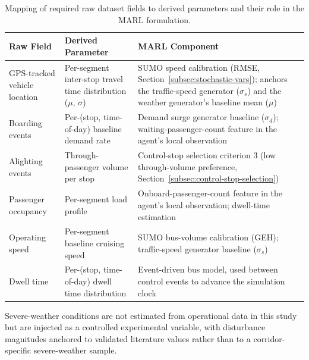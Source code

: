 \begin{table}[htbp]
\centering
\caption{Mapping of required raw dataset fields to derived parameters and their role in the MARL formulation.}
\label{tab:field-mapping}
\small
\renewcommand{\arraystretch}{1.25}

\begin{tabularx}{\textwidth}{
>{\RaggedRight\arraybackslash}p{}
>{\RaggedRight\arraybackslash}p{}
>{\RaggedRight\arraybackslash}X
}

\toprule
\textbf{Raw Field} & \textbf{Derived Parameter} & \textbf{MARL Component} \\
\midrule

GPS-tracked vehicle location &
Per-segment inter-stop travel time distribution ($\mu$, $\sigma$) &
SUMO speed calibration (RMSE, Section~\ref{subsec:stochastic-vars}); anchors the traffic-speed generator ($\sigma_s$) and the weather generator's baseline mean ($\mu$) \\

Boarding events &
Per-(stop, time-of-day) baseline demand rate &
Demand surge generator baseline ($\sigma_d$); waiting-passenger-count feature in the agent's local observation \\

Alighting events &
Through-passenger volume per stop &
Control-stop selection criterion 3 (low through-volume preference, Section~\ref{subsec:control-stop-selection}) \\

Passenger occupancy &
Per-segment load profile &
Onboard-passenger-count feature in the agent's local observation; dwell-time estimation \\

Operating speed &
Per-segment baseline cruising speed &
SUMO bus-volume calibration (GEH); traffic-speed generator baseline ($\sigma_s$) \\

Dwell time &
Per-(stop, time-of-day) dwell time distribution &
Event-driven bus model, used between control events to advance the simulation clock \\

\bottomrule
\end{tabularx}
\end{table}

Severe-weather conditions are not estimated from operational data in this study but are injected as a controlled experimental variable, with disturbance magnitudes anchored to validated literature values rather than to a corridor-specific severe-weather sample.

